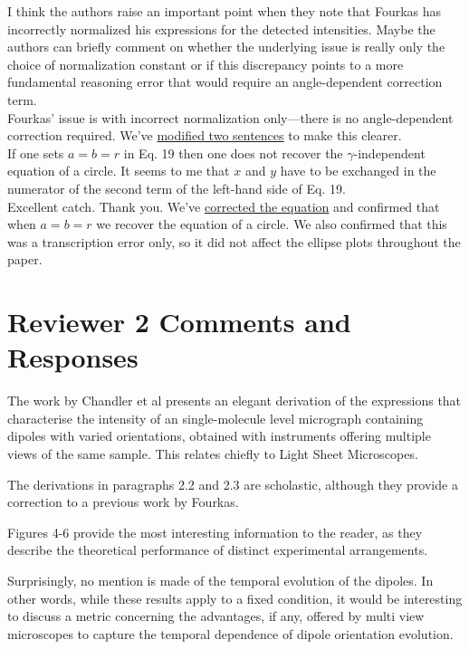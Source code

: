 \documentclass[10pt]{article}
\begin{document}
{\color{OE} I think the authors raise an important point when they note that
  Fourkas has incorrectly normalized his expressions for the detected
  intensities. Maybe the authors can briefly comment on whether the underlying
  issue is really only the choice of normalization constant or if this
  discrepancy points to a more fundamental reasoning error that would require an
  angle-dependent correction term.}\\

Fourkas' issue is with incorrect normalization only---there is no
angle-dependent correction required. We've \hyperlink{normalization}{\color{urlblue}
  modified two sentences} to make this clearer.\\

{\color{OE} If one sets $a=b=r$ in Eq. 19 then one does not recover the
  $\gamma$-independent equation of a circle. It seems to me that $x$ and $y$
  have to be exchanged in the
  numerator of the second term of the left-hand side of Eq. 19.}\\

Excellent catch. Thank you. We've \hyperlink{ellipse}{\color{urlblue}
  corrected the equation} and confirmed that when
$a=b=r$ we recover the equation of a circle. We also confirmed that this was a
transcription error only, so it did not affect the ellipse plots throughout the
paper.

\section*{Reviewer 2 Comments and Responses}

{\color{OE} The work by Chandler et al presents an elegant derivation of the
  expressions that characterise the intensity of an single-molecule level
  micrograph containing dipoles with varied orientations, obtained with
  instruments offering multiple views of the same sample. This relates chiefly
  to Light Sheet Microscopes.}

{\color{OE} The derivations in paragraphs 2.2 and 2.3 are scholastic, although
  they provide a correction to a previous work by Fourkas.}

{\color{OE} Figures 4-6 provide the most interesting information to the
  reader, as they describe the theoretical performance of distinct experimental
  arrangements.}

{\color{OE} Surprisingly, no mention is made of the temporal evolution of the
  dipoles. In other words, while these results apply to a fixed condition, it
  would be interesting to discuss a metric concerning the advantages, if any,
  offered by multi view microscopes to capture the temporal dependence of dipole
  orientation evolution.}\\
\end{document}
